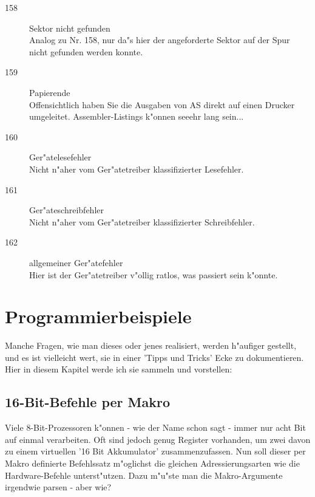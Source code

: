 \documentclass[12pt,a4paper,twoside]{report}
\newcommand{\asname}{AS}
\begin{document}
\begin{description}
\item[158]{Sektor nicht gefunden\\
           Analog zu Nr. 158, nur da"s hier der angeforderte Sektor auf
           der Spur nicht gefunden werden konnte.}

\item[159]{Papierende\\
           Offensichtlich haben Sie die Ausgaben von \asname{} direkt auf einen
           Drucker umgeleitet.  Assembler-Listings k"onnen seeehr lang
           sein...}

\item[160]{Ger"atelesefehler\\
           Nicht n"aher vom Ger"atetreiber klassifizierter Lesefehler.}

\item[161]{Ger"ateschreibfehler\\
           Nicht n"aher vom Ger"atetreiber klassifizierter Schreibfehler.}

\item[162]{allgemeiner Ger"atefehler\\
           Hier ist der Ger"atetreiber v"ollig ratlos, was passiert
           sein k"onnte.}
\end{description}


\cleardoublepage
\chapter{Programmierbeispiele}

Manche Fragen, wie man dieses oder jenes realisiert, werden h"aufiger gestellt,
und es ist vielleicht wert, sie in einer 'Tipps und Tricks' Ecke zu
dokumentieren.  Hier in diesem Kapitel werde ich sie sammeln und vorstellen:

\section{16-Bit-Befehle per Makro}

Viele 8-Bit-Prozessoren k"onnen - wie der Name schon sagt - immer nur acht Bit
auf einmal verarbeiten.  Oft sind jedoch genug Register vorhanden, um zwei
davon zu einem virtuellen '16 Bit Akkumulator' zusammenzufassen.  Nun soll dieser
per Makro definierte Befehlssatz m"oglichst die gleichen Adressierungsarten
wie die Hardware-Befehle unterst"utzen.  Dazu m"u"ste man die Makro-Argumente
irgendwie parsen - aber wie?
\end{document}
